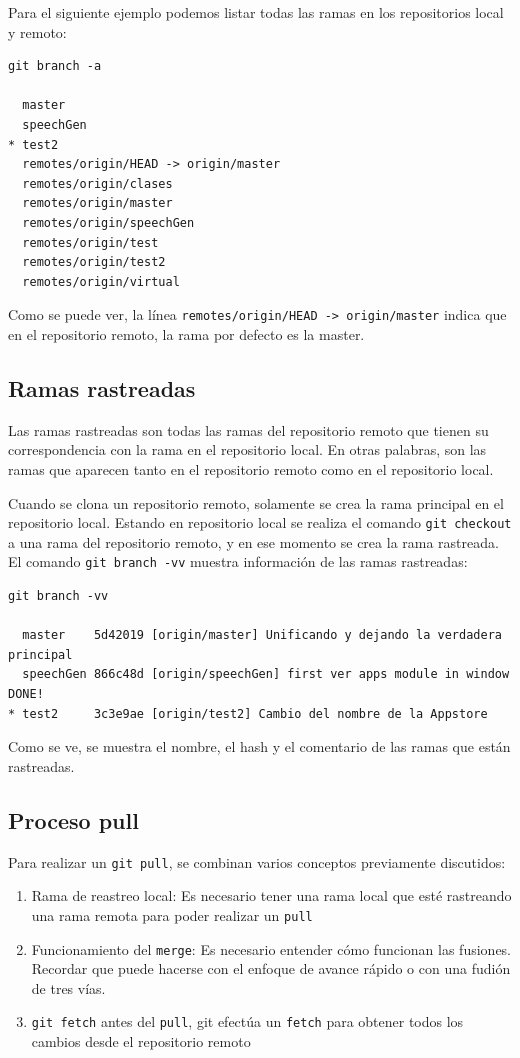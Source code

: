 Para el siguiente ejemplo podemos listar todas las ramas en los repositorios local y remoto:

\begin{verbatim}
git branch -a     

  master
  speechGen
* test2
  remotes/origin/HEAD -> origin/master
  remotes/origin/clases
  remotes/origin/master
  remotes/origin/speechGen
  remotes/origin/test
  remotes/origin/test2
  remotes/origin/virtual
\end{verbatim}

Como se puede ver, la línea \texttt{remotes/origin/HEAD -> origin/master} indica que en el repositorio remoto, la rama por defecto es la master.

\subsection{Ramas rastreadas}

Las ramas rastreadas son todas las ramas del repositorio remoto que tienen su correspondencia con la rama en el repositorio local. En otras palabras, son las ramas que aparecen tanto en el repositorio remoto como en el repositorio local.

Cuando se clona un repositorio remoto, solamente se crea la rama principal en el repositorio local. Estando en repositorio local se realiza el comando \texttt{git checkout} a una rama del repositorio remoto, y en ese momento se crea la rama rastreada. El comando \texttt{git branch -vv} muestra información de las ramas rastreadas:

\begin{verbatim}
git branch -vv

  master    5d42019 [origin/master] Unificando y dejando la verdadera principal
  speechGen 866c48d [origin/speechGen] first ver apps module in window DONE!
* test2     3c3e9ae [origin/test2] Cambio del nombre de la Appstore
\end{verbatim}

Como se ve, se muestra el nombre, el hash y el comentario de las ramas que están rastreadas.

\subsection{Proceso pull}

Para realizar un \texttt{git pull}, se combinan varios conceptos previamente discutidos:

\begin{enumerate}
    \item Rama de reastreo local: Es necesario tener una rama local que esté rastreando una rama remota para poder realizar un \texttt{pull}
    \item Funcionamiento del \texttt{merge}: Es necesario entender cómo funcionan las fusiones. Recordar que puede hacerse con el enfoque de avance rápido o con una fudión de tres vías.
    \item \texttt{git fetch} antes del \texttt{pull}, git efectúa un \texttt{fetch} para obtener todos los cambios desde el repositorio remoto
\end{enumerate}


